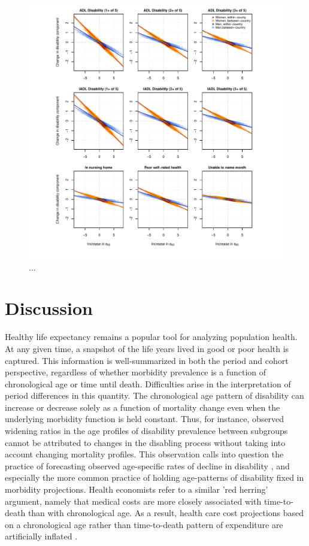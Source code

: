 \documentclass[11pt,oneside,a4paper]{article} %
\begin{document}
\begin{figure}
\begin{adjustwidth}{-1.5cm}{}
	\centering
	\includegraphics[scale=.8]{Decomp_3x3.pdf}
	\caption{...}
	\label{fig:Fig_Decomp_3x3}
\end{adjustwidth}
\end{figure}



\FloatBarrier
\section{Discussion}

Healthy life expectancy remains a popular tool for analyzing population health.
At any given time, a snapshot of the life years lived in good or poor health is
captured. This information is well-summarized in both the period and
cohort perspective, regardless of whether morbidity prevalence is a function of
chronological age or time until death. Difficulties arise in the
interpretation of period differences in this quantity. The chronological age
pattern of disability can increase or decrease solely as a function of mortality
change even when the underlying morbidity function is held constant. Thus, for
instance, observed widening ratios in the age profiles of disability prevalence
between subgroups \citep{Crimmins2001} cannot be attributed to changes in the
disabling process without taking into account changing mortality profiles. This
observation calls into question the practice of forecasting observed
age-specific rates of decline in disability \citep{Manton2006,Khaw1999}, and
especially the more common practice of holding age-patterns of disability fixed
in morbidity projections.
Health economists refer to a similar 'red herring' argument, namely that medical costs are more closely associated with time-to-death than with chronological age. As a result, health
care cost projections based on a chronological age rather than time-to-death
pattern of expenditure are artificially inflated \citep{Zweifel1999,Geue2014}.
\end{document}
